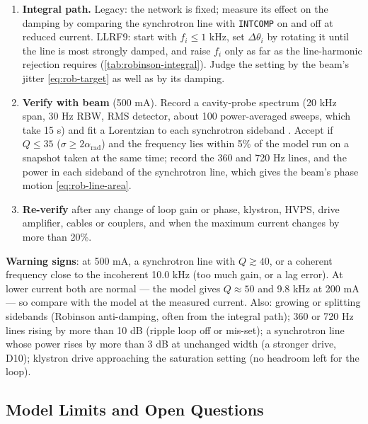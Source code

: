 \begin{enumerate}
\item \textbf{Integral path.} Legacy: the network is fixed; measure its effect on the damping by comparing the synchrotron line with \texttt{INTCOMP} on and off at reduced current. LLRF9: start with \(f_i \le 1\) kHz, set \(\Delta\theta_i\) by rotating it until the line is most strongly damped, and raise \(f_i\) only as far as the line-harmonic rejection requires (\cref{tab:robinson-integral}). Judge the setting by the beam's jitter \eqref{eq:rob-target} as well as by its damping.
\item \textbf{Verify with beam} (500 mA). Record a cavity-probe spectrum (20 kHz span, 30 Hz RBW, RMS detector, about 100 power-averaged sweeps, which take 15 s) and fit a Lorentzian to each synchrotron sideband . Accept if \(Q \le 35\) (\(\sigma \ge 2\alpha_\text{rad}\)) and the frequency lies within 5\% of the model run on a snapshot taken at the same time; record the 360 and 720 Hz lines, and the power in each sideband of the synchrotron line, which gives the beam's phase motion \eqref{eq:rob-line-area}.
\item \textbf{Re-verify} after any change of loop gain or phase, klystron, HVPS, drive amplifier, cables or couplers, and when the maximum current changes by more than 20\%.
\end{enumerate}

\begin{warnbox}
\textbf{Warning signs}: at 500 mA, a synchrotron line with \(Q \gtrsim 40\), or a coherent frequency close to the incoherent 10.0 kHz (too much gain, or a lag error). At lower current both are normal --- the model gives \(Q \approx 50\) and 9.8 kHz at 200 mA --- so compare with the model at the measured current. Also: growing or splitting sidebands (Robinson anti-damping, often from the integral path); 360 or 720 Hz lines rising by more than 10 dB (ripple loop off or mis-set); a synchrotron line whose power rises by more than 3 dB at unchanged width (a stronger drive, D10); klystron drive approaching the saturation setting (no headroom left for the loop).
\end{warnbox}

\subsection{Model Limits and Open Questions}\label{sec:robinson-open}

